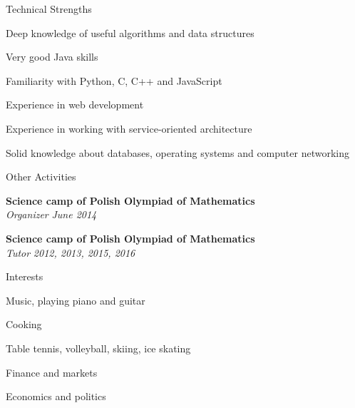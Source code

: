 \documentclass{resume} %
\begin{document}

\begin{rSection}{Technical Strengths}

Deep knowledge of useful algorithms and data structures

Very good Java skills

Familiarity with Python, C, C++ and JavaScript

Experience in web development

Experience in working with service-oriented architecture

Solid knowledge about databases, operating systems and computer networking

\end{rSection}


\begin{rSection}{Other Activities}

{\bf Science camp of Polish Olympiad of Mathematics}
\\
{\em Organizer} \hfill{\em June 2014}

{\bf Science camp of Polish Olympiad of Mathematics}
\\
{\em Tutor} \hfill{\em 2012, 2013, 2015, 2016}

\end{rSection}


 \begin{rSection}{Interests}

Music, playing piano and guitar

Cooking

Table tennis, volleyball, skiing, ice skating

Finance and markets

Economics and politics

\end{rSection}

\end{document}
